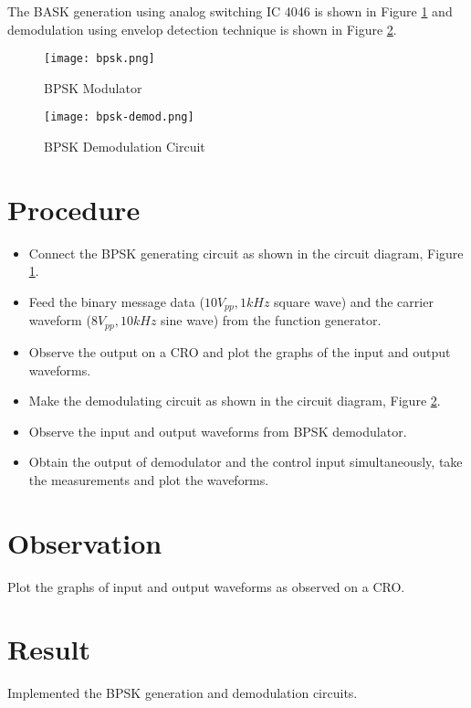 The BASK generation using analog switching IC 4046 is shown in Figure \ref{bpsk-gen} and demodulation using envelop detection technique is shown in Figure \ref{bpsk-det}.

\begin{figure}[h]
	\texttt{[image: bpsk.png]}
	\caption{BPSK Modulator}
	\label{bpsk-gen}
\end{figure}

\begin{figure}
	\texttt{[image: bpsk-demod.png]}
	\caption{BPSK Demodulation Circuit}
	\label{bpsk-det}
\end{figure}

\clearpage
\section*{Procedure}
\begin{itemize}
\item
Connect the BPSK generating circuit as shown in the circuit diagram, Figure \ref{bpsk-gen}.
\item
Feed the binary message data ($10 V_{pp}, 1 kHz$ square wave) and the carrier waveform  ($8 V_{pp}, 10 kHz$ sine wave) from the function generator.
\item
Observe the output on a CRO and plot the graphs of the input and output waveforms.
\item
Make the demodulating circuit as shown in the circuit diagram, Figure \ref{bpsk-det}.
\item
Observe the input and output waveforms from BPSK demodulator.
\item 
Obtain the output of demodulator and the control input simultaneously, take the measurements and plot the waveforms.

\end{itemize}
\section*{Observation}
Plot the graphs of input and output waveforms as observed on a CRO.
\section*{Result}

Implemented the BPSK generation and demodulation circuits.